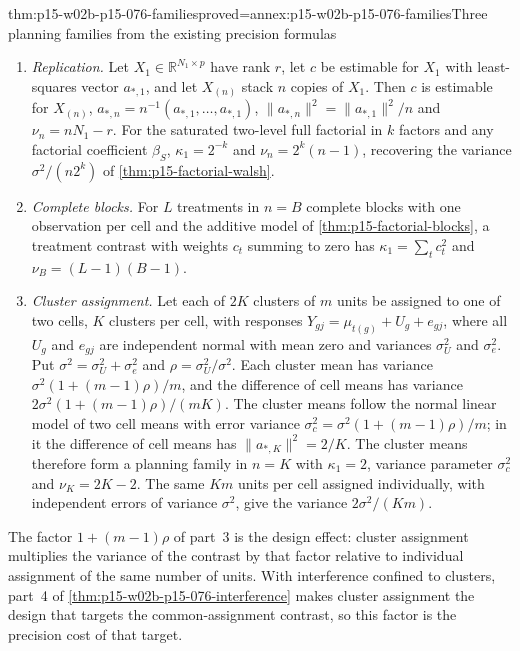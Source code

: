 \begin{hblemma}{thm:p15-w02b-p15-076-families}{proved=annex:p15-w02b-p15-076-families}{Three planning families from the existing precision formulas}
\begin{enumerate}
\item \emph{Replication.} Let \(X_1\in\mathbb R^{N_1\times p}\) have rank
      \(r\), let \(c\) be estimable for \(X_1\) with least-squares vector
      \(a_{*,1}\), and let \(X_{(n)}\) stack \(n\) copies of \(X_1\).
      Then \(c\) is estimable for \(X_{(n)}\),
      \(a_{*,n}=n^{-1}(a_{*,1},\ldots,a_{*,1})\),
      \(\|a_{*,n}\|^2=\|a_{*,1}\|^2/n\) and \(\nu_n=nN_1-r\). For the
      saturated two-level full factorial in \(k\) factors and any
      factorial coefficient \(\beta_S\), \(\kappa_1=2^{-k}\) and
      \(\nu_n=2^k(n-1)\), recovering the variance \(\sigma^2/(n2^k)\) of
      \cref{thm:p15-factorial-walsh}.
\item \emph{Complete blocks.} For \(L\) treatments in \(n=B\) complete
      blocks with one observation per cell and the additive model of
      \cref{thm:p15-factorial-blocks}, a treatment contrast with weights
      \(c_t\) summing to zero has \(\kappa_1=\sum_tc_t^2\) and
      \(\nu_B=(L-1)(B-1)\).
\item \emph{Cluster assignment.} Let each of \(2K\) clusters of \(m\)
      units be assigned to one of two cells, \(K\) clusters per cell, with
      responses \(Y_{gj}=\mu_{t(g)}+U_g+e_{gj}\), where all \(U_g\) and
      \(e_{gj}\) are independent normal with mean zero and variances
      \(\sigma_U^2\) and \(\sigma_e^2\). Put
      \(\sigma^2=\sigma_U^2+\sigma_e^2\) and
      \(\rho=\sigma_U^2/\sigma^2\). Each cluster mean has variance
      \(\sigma^2(1+(m-1)\rho)/m\), and the difference of cell means has
      variance \(2\sigma^2(1+(m-1)\rho)/(mK)\). The cluster means follow
      the normal linear model of two cell means with error variance
      \(\sigma_c^2=\sigma^2(1+(m-1)\rho)/m\); in it the difference of cell
      means has \(\|a_{*,K}\|^2=2/K\). The cluster means therefore form a
      planning family in \(n=K\) with \(\kappa_1=2\), variance parameter
      \(\sigma_c^2\) and \(\nu_K=2K-2\). The same \(Km\) units per cell
      assigned individually, with independent errors of variance
      \(\sigma^2\), give the variance \(2\sigma^2/(Km)\).
\end{enumerate}
\end{hblemma}

The factor \(1+(m-1)\rho\) of part~3 is the design effect: cluster
assignment multiplies the variance of the contrast by that factor
relative to individual assignment of the same number of units. With
interference confined to clusters, part~4 of
\cref{thm:p15-w02b-p15-076-interference} makes cluster assignment the
design that targets the common-assignment contrast, so this factor is the
precision cost of that target.

